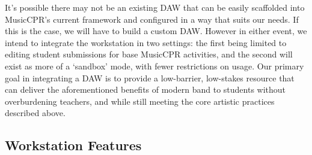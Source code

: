\documentclass[manuscript,screen,review]{acmart}
\begin{document}
It's possible there may not be an existing DAW that can be easily scaffolded into MusicCPR's current framework and configured in a way that suits our needs.
If this is the case, we will have to build a custom DAW.
However in either event, we intend to integrate the workstation in two settings: the first being limited to editing student submissions for base MusicCPR activities, and the second will exist as more of a `sandbox' mode, with fewer restrictions on usage.
Our primary goal in integrating a DAW is to provide a low-barrier, low-stakes resource that can deliver the aforementioned benefits of modern band to students without overburdening teachers, and while still meeting the core artistic practices described above.

\renewcommand{\thefootnote}{\fnsymbol{footnote}}
\subsection{Workstation Features}
\end{document}
